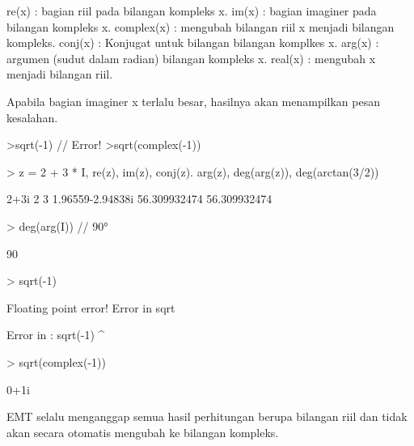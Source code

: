 \documentclass[a4paper,10pt]{article}
\begin{document}
\begin{eulernotebook}
\begin{eulercomment}
\begin{eulercomment}
\begin{eulercomment}
\end{eulercomment}
\begin{eulerttcomment}
  re(x) : bagian riil pada bilangan kompleks x.
  im(x) : bagian imaginer pada bilangan kompleks x.
  complex(x) : mengubah bilangan riil x menjadi bilangan kompleks.
  conj(x) : Konjugat untuk bilangan bilangan komplkes x.
  arg(x) : argumen (sudut dalam radian) bilangan kompleks x.
  real(x) : mengubah x menjadi bilangan riil.
\end{eulerttcomment}
\begin{eulercomment}

Apabila bagian imaginer x terlalu besar, hasilnya akan menampilkan
pesan kesalahan.

\end{eulercomment}
\begin{eulerttcomment}
  >sqrt(-1) // Error!
  >sqrt(complex(-1))
\end{eulerttcomment}
\begin{eulerprompt}
> z = 2 + 3 * I, re(z), im(z), conj(z). arg(z), deg(arg(z)), deg(arctan(3/2))
\end{eulerprompt}
\begin{euleroutput}
  2+3i
  2
  3
  1.96559-2.94838i
  56.309932474
  56.309932474
\end{euleroutput}
\begin{eulerprompt}
> deg(arg(I)) // 90°
\end{eulerprompt}
\begin{euleroutput}
  90
\end{euleroutput}
\begin{eulerprompt}
> sqrt(-1)
\end{eulerprompt}
\begin{euleroutput}
  Floating point error!
  Error in sqrt
  
  Error in :
   sqrt(-1)
           ^
\end{euleroutput}
\begin{eulerprompt}
> sqrt(complex(-1))
\end{eulerprompt}
\begin{euleroutput}
  0+1i
\end{euleroutput}
\begin{eulercomment}
EMT selalu menganggap semua hasil perhitungan berupa bilangan riil dan
tidak akan secara otomatis mengubah ke bilangan kompleks.


\end{eulercomment}
\end{eulercomment}
\end{eulercomment}
\end{eulernotebook}
\end{document}
